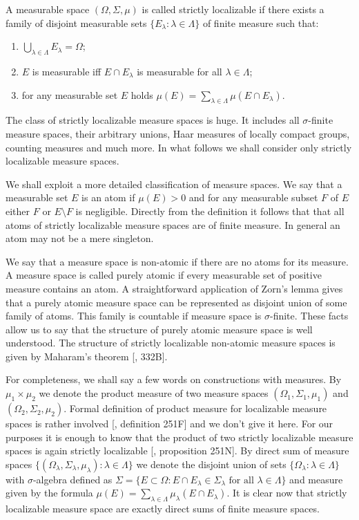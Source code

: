 A measurable space $(\Omega,\Sigma,\mu)$ is called strictly localizable if there
exists a family of disjoint measurable sets 
$ \{E_\lambda:\lambda\in\Lambda \}$ of finite measure such that: 
\begin{enumerate}[label = (\roman*)]
  \item $\bigcup_{\lambda\in\Lambda}E_\lambda=\Omega$;

  \item $E$ is measurable iff $E\cap E_\lambda$ is measurable for all
  $\lambda\in\Lambda$;

  \item for any measurable set $E$ holds 
  $\mu(E)=\sum_{\lambda\in\Lambda}\mu(E\cap E_\lambda)$. 
\end{enumerate}
  
The class of strictly localizable measure spaces is huge. It includes all
$\sigma$-finite measure spaces, their arbitrary unions, Haar measures of
locally compact groups, counting measures and much more. In what follows we
shall consider only strictly localizable measure spaces.

We shall exploit a more detailed classification of measure spaces. We say that a
measurable set $E$ is an atom if $\mu(E)>0$ and for any measurable subset $F$ of
$E$ either $F$ or $E\setminus F$ is negligible. Directly from the definition it
follows that that all atoms of strictly localizable measure spaces are of finite
measure. In general an atom may not be a mere singleton.

We say that a measure space is non-atomic if there are no atoms for its measure.
A measure space is called purely atomic if every measurable set of positive
measure contains an atom. A straightforward application of Zorn's lemma gives
that a purely atomic measure space can be represented as disjoint union of some
family of atoms. This family is countable if measure space is $\sigma$-finite.
These facts allow us to say that the structure of purely atomic measure space is
well understood. The structure of strictly localizable non-atomic measure spaces
is given by Maharam's theorem [\cite{FremMeasTh}, 332B]. 

For completeness, we shall say a few words on constructions with measures. 
By $\mu_1\times \mu_2$ we denote the product measure of two measure spaces 
$(\Omega_1,\Sigma_1,\mu_1)$ and $(\Omega_2,\Sigma_2,\mu_2)$. Formal definition of
product measure for localizable measure spaces is rather involved
[\cite{FremMeasTh}, definition 251F] and we don't give it here.  For our
purposes it is enough to know that the product of two strictly localizable
measure spaces is again strictly localizable [\cite{FremMeasTh}, proposition
251N]. By direct sum of measure spaces $ \{(\Omega_\lambda, \Sigma_\lambda,
\mu_\lambda):\lambda\in\Lambda \}$ we denote the disjoint union of sets 
$\{\Omega_\lambda:\lambda\in\Lambda \}$ with $\sigma$-algebra defined as 
$\Sigma= \{
  E\subset \Omega: E\cap E_\lambda\in\Sigma_\lambda
  \mbox{ for all }\lambda\in\Lambda
 \}$ 
and measure given by the formula 
$\mu(E)=\sum_{\lambda\in\Lambda}\mu_\lambda(E\cap E_\lambda)$. It is clear now
that strictly localizable measure space are exactly direct sums of finite
measure spaces.

